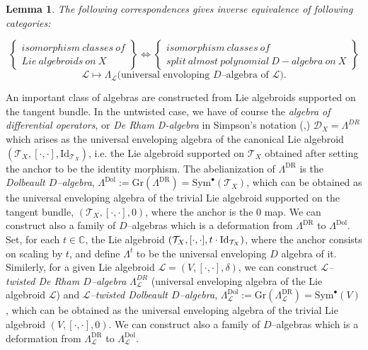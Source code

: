 \documentclass[12pt,reqno]{amsart}
\DeclareMathOperator{\Id}{{\rm Id}}
\numberwithin{equation}{subsection}
\newtheorem{lem}[equation]{Lemma}
\theoremstyle{definition}
\theoremstyle{theorem}
\begin{document}
\begin{lem}\label{Lie algebroid is-equivalent-to-Lambda_L}\cite[\S\,3, Theorem  3.12]{Alfaya-Oliveire-2024}
	The following correspondences gives inverse equivalence of following categories:
	
	$$
	\left\{
	\begin{array}{c}
		isomorphism \ classes \ of \\ Lie \ algebroids \ on \ X
	\end{array}
	\right\}
	\Longleftrightarrow 
	\left\{
	\begin{array}{c}
		isomorphism \ classes \ of \\ split \ almost \ polynomial \  D-algebra \ on \ X
	\end{array}
	\right\}
	$$
	$$\mathcal{L}\mapsto \Lambda_{\mathcal{L}}(\text{universal envoloping $D$--algebra of $\mathcal{L})$}.$$
\end{lem}

An important class of algebras are constructed from Lie algebroids supported on the tangent bundle. In the untwisted case, we have of course the \textit{algebra of differential operators}, or \textit{De Rham D-algebra} in Simpson’s notation (\cite[\S\,6]{CT.Simpson-1995},\cite[\S\,2]{CT.Simpson-1994}) $\mathscr{D}_{X}=\Lambda^{DR}$ which arises as the universal enveloping algebra of the canonical Lie algebroid $(\mathcal{T}_{X}, [\cdot, \cdot],\text{Id}_{\mathcal{T}_{X}})$, i.e. the Lie algebroid supported on $\mathcal{T}_{X}$ obtained after setting the anchor to be the identity morphism. The abelianization of $\Lambda^{\text{DR}}$ is the \textit{Dolbeault $D$--algebra}, $\Lambda^{\text{Dol}}:= \text{Gr}(\Lambda^{\text{DR}})=\text{Sym}^{\bullet}(\mathcal{T}_{X})$,
which can be obtained as the universal enveloping algebra of the trivial Lie algebroid supported on the tangent bundle, $(\mathcal{T}_{X}, [\cdot, \cdot],0)$, where the anchor is the $0$ map. We can construct also a family of $D$--algebras which is a deformation from $\Lambda^{\text{DR}}$ to $\Lambda^{\text{Dol}}$. Set, for each $t \in \mathbb{C}$, the Lie algebroid $(\mathcal{T}_{X},[\cdot,\cdot],t\cdot \Id_{\mathcal{T}_{X}})$, where the anchor consists on scaling by $t$, and define $\Lambda^{t}$ to be the universal enveloping $D$ algebra of it. Similerly, for a given Lie algebroid $\mathcal{L}=(V,[\cdot,\cdot],\delta)$, we can construct \textit{$\mathcal{L}$--twisted De Rham $D$--algebra} $\Lambda^{DR}_{\mathcal{L}}$ (universal enveloping algebra of the Lie algebroid $\mathcal{L}$) and \textit{$\mathcal{L}$--twisted Dolbeault $D$--algebra}, $\Lambda_{\mathcal{L}}^{\text{Dol}}:= \text{Gr}(\Lambda_{\mathcal{L}}^{\text{DR}})=\text{Sym}^{\bullet}(V)$, which can be obtained as the universal enveloping algebra of the trivial Lie algebroid $(V,[\cdot,\cdot],0)$.  We can construct also a family of $D$--algebras which is a deformation from $\Lambda_{\mathcal{L}}^{\text{DR}}$ to $\Lambda_{\mathcal{L}}^{\text{Dol}}$.
\end{document}
